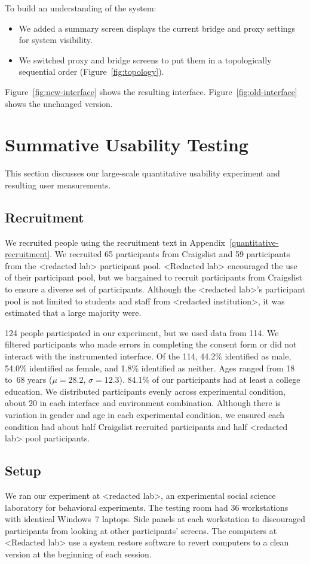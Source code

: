 \documentclass[USenglish,oneside,twocolumn]{article}
\begin{document}
To build an understanding of the system:
\begin{itemize}
\item We added a summary screen displays the current bridge and proxy settings for system visibility. 
\item We switched proxy and bridge screens to put them in a topologically sequential order (Figure~\ref{fig:topology}).
\end{itemize}

Figure~\ref{fig:new-interface} shows the resulting interface.  Figure~\ref{fig:old-interface} shows the unchanged version. 

\section{Summative Usability Testing}
\label{sec:quantitative}
This section discusses our large-scale quantitative usability experiment and resulting user measurements. 

\subsection{Recruitment}
We recruited  people using the recruitment text in Appendix~\ref{quantitative-recruitment}. We recruited 65 participants from Craigslist and 59 participants from the <redacted lab> participant pool. <Redacted lab> encouraged the use of their participant pool, but we bargained to recruit participants from Craigslist to ensure a diverse set of participants. Although the <redacted lab>'s participant pool is not limited to students and staff from <redacted institution>, it was estimated that a large majority were. 

124 people participated in our experiment, but we used data from 114. We filtered participants who made errors in completing the consent form or did not interact with the instrumented interface. Of the 114, 44.2\% identified as male, 54.0\% identified as female, and 1.8\% identified as neither. Ages ranged from 18 to~68 years ($\mu = 28.2$, $\sigma = 12.3$). 84.1\% of our participants had at least a college education. We distributed participants evenly across experimental condition, about 20 in each interface and environment combination. Although there is variation in gender and age in each experimental condition, we ensured each condition had about half Craigslist recruited participants and half <redacted lab>  pool participants. 

\subsection{Setup}
We ran our experiment at <redacted lab>, an experimental social science laboratory for behavioral experiments. The testing room had 36 workstations with identical Windows~7 laptops. Side panels at each workstation to discouraged participants from looking at other participants' screens. 
The computers at <Redacted lab> use a system restore software to revert computers to a clean version at the beginning of each session. 
\end{document}
